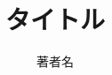 \documentclass[a4paper,12pt]{ltjarticle}
\numberwithin{equation}{section}
\begin{document}
\title{タイトル}
\author{著者名}
\maketitle

\tableofcontents

\twocolumn



\cite{key}



\end{document}
